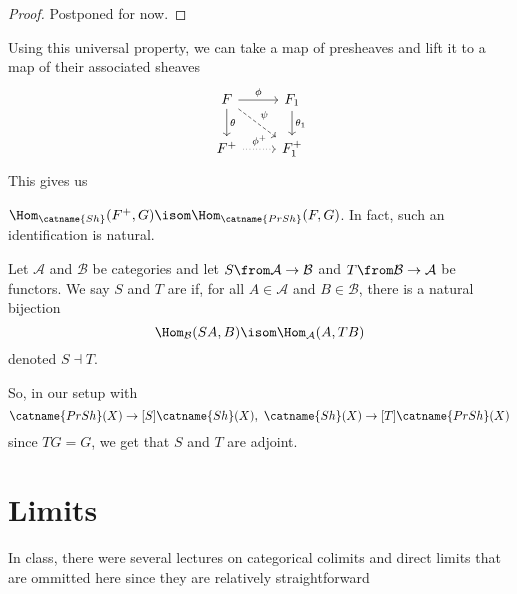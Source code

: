\documentclass[11pt,leqno,oneside]{amsbook}
\renewcommand{\F}{F}
\newcommand{\cA}{\mathcal{A}}
\newcommand{\cB}{\mathcal{B}}
\newcommand{\adjoint}{\dashv}
\numberwithin{thm}{section}
\begin{document}
\begin{proof}
  Postponed for now.
\end{proof}
Using this universal property, we can take a map of presheaves and
lift it to a map of their associated sheaves \[
  \begin{tikzcd}
    \F \ar[d, "\theta"]\ar[r, "\phi"] \ar[rd, dashed, "\psi"] & \F_1 \ar[d, "\theta_1"]\\
    \F^+ \ar[r, dotted, "\phi^+"] & \F_1^+
  \end{tikzcd}
\]
This gives us
\begin{prop}
  \(\Hom_{\catname{Sh}}(\F^+,G) \isom
  \Hom_{\catname{PrSh}}(F,G)\). In fact, such an identification is natural.
\end{prop}
\begin{defn}
  Let \(\cA\) and \(\cB\) be categories and let \(S \from \cA \to
  \cB\)  and \(T \from \cB \to \cA\) be functors. We say \(S\) and
  \(T\) are  if, for all \(A \in \cA\) and \(B \in \cB\),
  there is a natural bijection \[
    \Hom_{\cB}(SA,B) \isom \Hom_{\cA}(A,TB)
  \]
  denoted \(S \adjoint T\).
\end{defn}
So, in our setup with \[
  \catname{PrSh}(X) \to[S] \catname{Sh}(X), \ \catname{Sh}(X) \to[T] \catname{PrSh}(X)
\]
since \(TG = G\), we get that \(S\) and \(T\) are adjoint.
\section{Limits}
In class, there were several lectures on categorical colimits and
direct limits that are ommitted here 
since they are relatively straightforward
\end{document}

